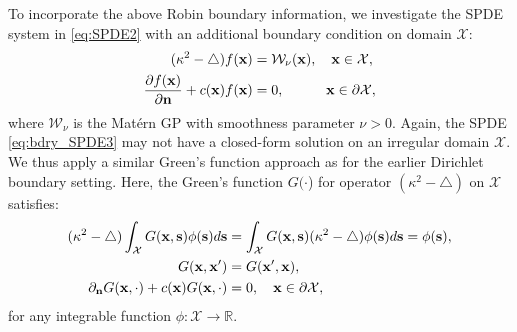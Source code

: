 \documentclass[aos,preprint]{imsart}
\theoremstyle{plain}
\newcommand{\Real}{\mathbb R}
\newcommand{\CalX}{\mathcal X}
\newcommand{\Bx}{\bold x}
\newcommand{\Bs}{\bold s}
\newcommand{\BFx}{\bold x}
\newcommand{\CalW}{\mathcal{W}}
\theoremstyle{remark}
\begin{document}
To incorporate the above Robin boundary information, we investigate the SPDE system in \eqref{eq:SPDE2} with an additional boundary condition on domain $\mathcal{X}$:
\begin{align}
\label{eq:bdry_SPDE3}
\begin{split}
    (\kappa^2-\bigtriangleup)f(\BFx) & =\CalW_\nu(\BFx), \quad \BFx\in\CalX, 
    \\
    \frac{\partial f(\Bx)}{\partial \bold{n}}+c(\mathbf{x})f(\Bx) & =0,\quad \quad \quad  \Bx\in\partial \CalX,
\end{split}
\end{align}
where $\mathcal{W}_\nu$ is the Mat\'ern GP with smoothness parameter $\nu > 0$. Again, the SPDE \eqref{eq:bdry_SPDE3} may not have a closed-form solution on an irregular domain $\mathcal{X}$. We thus apply a similar Green's function approach as for the earlier Dirichlet boundary setting. Here, the Green's function $G(\cdot$) for operator $(\kappa^2 - \bigtriangleup)$ on $\mathcal{X}$ satisfies:
\begin{align}
\begin{split}
    (\kappa^2-\bigtriangleup)\int_\CalX G(\BFx,\Bs)\phi(\Bs) d\Bs & =\int_\CalX G(\BFx,\Bs)(\kappa^2-\bigtriangleup)\phi(\Bs) d\Bs=\phi(\Bs),\\
    G(\BFx,\Bx')&=G(\BFx',\Bx),\\
    \partial_{\bold{n}}G(\Bx,\cdot)+c(\mathbf{x})G(\Bx,\cdot)&=0, \quad \Bx\in \partial\CalX,
\end{split}
\label{eq:greendef2}
\end{align}
for any integrable function $\phi: \mathcal{X} \rightarrow \Real$.
\end{document}
